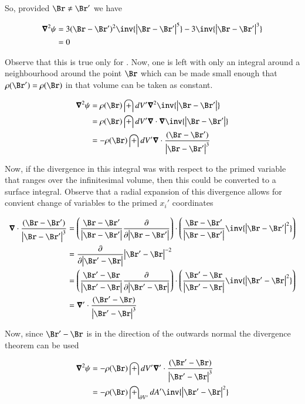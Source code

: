 \documentclass{article}
\begin{document}
So, provided $\Br \ne \Br'$ we have

\begin{align*}
\spacegrad^2 \psi &= 
3 (\Br - \Br')^2 \inv{ \Abs{\Br - \Br'}^5} 
- 3 \inv{ \Abs{\Br - \Br'}^3} \\
&= 0 
\end{align*}

Observe that this is true only for .  Now, one is left with only an integral around a neighbourhood around the point $\Br$ which can be made small enough that $\rho(\Br') = \rho(\Br)$ in that volume can be taken as constant.

\begin{align*}
\spacegrad^2 \psi 
&= \rho(\Br) \int dV' \spacegrad^2 \inv{\Abs{\Br - \Br'}} \\
&= \rho(\Br) \int dV' \spacegrad \cdot \spacegrad \inv{\Abs{\Br - \Br'}} \\
&= -\rho(\Br) \int dV' \spacegrad \cdot \frac{(\Br -\Br')}{\Abs{\Br - \Br'}^3} \\
\end{align*}

Now, if the divergence in this integral was with respect to the primed variable that ranges over the infinitesimal volume, then this could be converted to a surface integral.  
Observe that a radial expansion of this divergence allows for convient change of variables to the primed $x_i'$ coordinates

\begin{align*}
\spacegrad \cdot \frac{(\Br -\Br')}{\Abs{\Br - \Br'}^3}
&= 
\left(\frac{\Br - \Br'}{\Abs{\Br-\Br'}} \PD{\Abs{\Br-\Br'}}{}\right) \cdot
\left(\frac{\Br - \Br'}{\Abs{\Br-\Br'}} \inv{\Abs{\Br-\Br'}^2}\right) \\
&= 
\PD{\Abs{\Br'-\Br}}{} {\Abs{\Br'-\Br}^{-2}} \\
&= 
\left(\frac{\Br' - \Br}{\Abs{\Br'-\Br}} \PD{\Abs{\Br'-\Br}}{}\right) \cdot
\left(\frac{\Br' - \Br}{\Abs{\Br'-\Br}} \inv{\Abs{\Br'-\Br}^2}\right) \\
&= \spacegrad' \cdot \frac{(\Br'-\Br)}{\Abs{\Br' - \Br}^3}
\end{align*}

Now, since $\Br'-\Br$ is in the direction of the outwards normal the divergence theorem can be used

\begin{align*}
\spacegrad^2 \psi 
&= -\rho(\Br) \int dV' \spacegrad' \cdot \frac{(\Br' -\Br)}{\Abs{\Br' - \Br}^3} \\
&= -\rho(\Br) \int_{\partial V'} dA' \inv{\Abs{\Br' - \Br}^2} \\
\end{align*}
\end{document}
